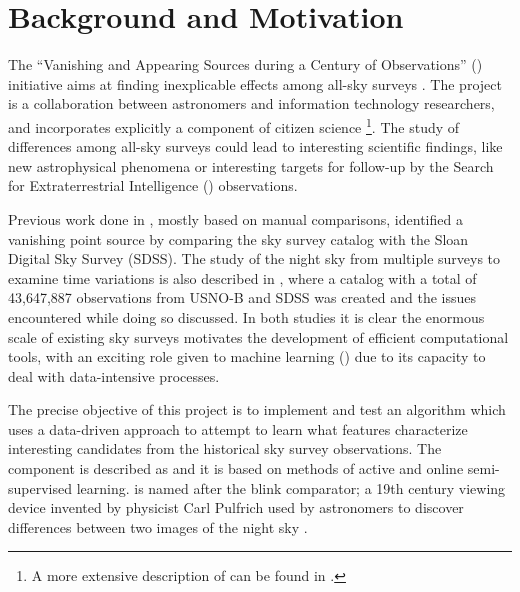 \section{Background and Motivation} \label{sect:intro:background}

The ``Vanishing and Appearing Sources during a Century of Observations'' (\vasco) initiative aims at finding inexplicable effects among all-sky surveys \cite{article:vasco-paper, article:our-sky}. The \vasco project is a collaboration between astronomers and information technology researchers, and incorporates explicitly a component of citizen science \footnote{A more extensive description of \vasco can be found in \cite{web:vasco}.}. The study of differences among all-sky surveys could lead to interesting scientific findings, like new astrophysical phenomena or interesting targets for follow-up by the Search for Extraterrestrial Intelligence (\seti) observations. \newline

Previous work done in \cite{article:our-sky}, mostly based on manual comparisons, identified a vanishing point source by comparing the \usno sky survey catalog with the Sloan Digital Sky Survey (SDSS). The study of the night sky from multiple surveys to examine time variations is also described in \cite{article:two-epoch-catalog}, where a catalog with a total of 43,647,887 observations from USNO-B and SDSS was created and the issues encountered while doing so discussed. In both studies it is clear the enormous scale of existing sky surveys motivates the development of efficient computational tools, with an exciting role given to machine learning (\ml) due to its capacity to deal with data-intensive processes. \newline

The precise objective of this project is to implement and test an \ml algorithm which uses a data-driven approach to attempt to learn what features characterize interesting candidates from the historical sky survey observations. The \ml component is described as \mlblink and it is based on methods of active and online semi-supervised learning. \mlblink is named after the blink comparator; a 19th century viewing device invented by physicist Carl Pulfrich used by astronomers to discover differences between two images of the night sky \cite{article:blink-comparator}. \newline

